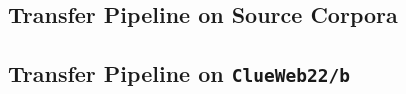 \subsection{Transfer Pipeline on Source Corpora}\label{eval-pairwise-preferences-source}

\subsection{Transfer Pipeline on \texttt{ClueWeb22/b}}\label{eval-pairwise-preferences-target}